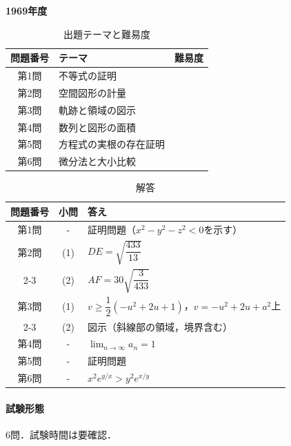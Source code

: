 \documentclass[../../main.tex]{subfiles}
\begin{document}
\begin{center}
  {\fontsize{48pt}{58pt}\selectfont \textbf{1969}\normalsize\textbf{年度}}
\end{center}

\begin{table}[htb]
  \centering
  \caption{出題テーマと難易度}
  \begin{tabular}{|c|p{9cm}|c|}
    \hline
    \textbf{問題番号} & \textbf{テーマ} & \textbf{難易度} \\
    \hline
    第1問 & 不等式の証明 & \\
    \hline
    第2問 & 空間図形の計量 & \\
    \hline
    第3問 & 軌跡と領域の図示 & \\
    \hline
    第4問 & 数列と図形の面積 & \\
    \hline
    第5問 & 方程式の実根の存在証明 & \\
    \hline
    第6問 & 微分法と大小比較 & \\
    \hline
  \end{tabular}
\end{table}

\begin{table}[htb]
  \centering
  \caption{解答}
  \renewcommand{\arraystretch}{1.4}
  \begin{tabular}{|c|c|p{9cm}|}
    \hline
    \textbf{問題番号} & \textbf{小問} & \textbf{答え} \\
    \hline
    第1問 & - & 証明問題（$x^2-y^2-z^2<0$を示す） \\
    \hline
    第2問 & (1) & $DE=\sqrt{\dfrac{433}{13}}$ \\
    \cline{2-3}
    & (2) & $AF=30\sqrt{\dfrac{3}{433}}$ \\
    \hline
    第3問 & (1) & $v \ge \dfrac{1}{2}(-u^2+2u+1)$，$v=-u^2+2u+a^2$上 \\
    \cline{2-3}
    & (2) & 図示（斜線部の領域，境界含む） \\
    \hline
    第4問 & - & $\displaystyle\lim_{n\to\infty}a_n=1$ \\
    \hline
    第5問 & - & 証明問題 \\
    \hline
    第6問 & - & $x^2e^{y/x}>y^2e^{x/y}$ \\
    \hline
  \end{tabular}
\end{table}

\paragraph{試験形態}
6問．試験時間は要確認．
\end{document}
